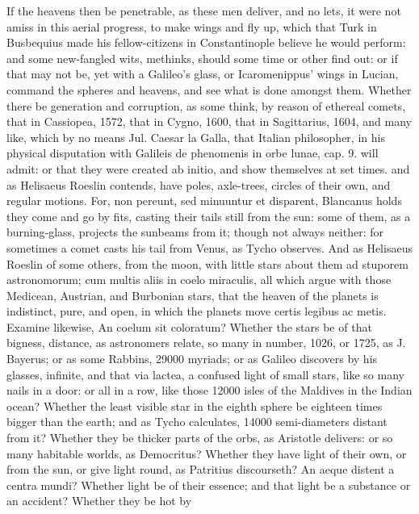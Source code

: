 {If the heavens then be penetrable, as these men deliver, and no lets,
it were not amiss in this aerial progress, to make wings and fly up,
which that Turk in Busbequius made his fellow-citizens in
Constantinople believe he would perform: and some new-fangled wits,
methinks, should some time or other find out: or if that may not be,
yet with a Galileo's glass, or Icaromenippus' wings in Lucian, command
the spheres and heavens, and see what is done amongst them. Whether
there be generation and corruption, as some think, by reason of
ethereal comets, that in Cassiopea, 1572, that in Cygno, 1600, that in
Sagittarius, 1604, and many like, which by no means Jul. Caesar la
Galla, that Italian philosopher, in his physical disputation with
Galileis de phenomenis in orbe lunae, cap. 9. will admit: or that they
were created ab initio, and show themselves at set times. and as
Helisaeus Roeslin contends, have poles, axle-trees, circles of
their own, and regular motions. For, non pereunt, sed minuuntur et
disparent, Blancanus holds they come and go by fits, casting
their tails still from the sun: some of them, as a burning-glass,
projects the sunbeams from it; though not always neither: for sometimes
a comet casts his tail from Venus, as Tycho observes. And as
Helisaeus Roeslin of some others, from the moon, with little
stars about them ad stuporem astronomorum; cum multis aliis in coelo
miraculis, all which argue with those Medicean, Austrian, and Burbonian
stars, that the heaven of the planets is indistinct, pure, and open, in
which the planets move certis legibus ac metis. Examine likewise, An
coelum sit coloratum? Whether the stars be of that bigness, distance,
as astronomers relate, so many in number, 1026, or 1725, as J.
Bayerus; or as some Rabbins, 29\thinspace{}000 myriads; or as Galileo discovers by
his glasses, infinite, and that via lactea, a confused light of small
stars, like so many nails in a door: or all in a row, like those 12\thinspace{}000
isles of the Maldives in the Indian ocean? Whether the least visible
star in the eighth sphere be eighteen times bigger than the earth; and
as Tycho calculates, 14\thinspace{}000 semi-diameters distant from it? Whether
they be thicker parts of the orbs, as Aristotle delivers: or so many
habitable worlds, as Democritus? Whether they have light of their own,
or from the sun, or give light round, as Patritius discourseth? An
aeque distent a centra mundi? Whether light be of their essence; and
that light be a substance or an accident? Whether they be hot by
}
